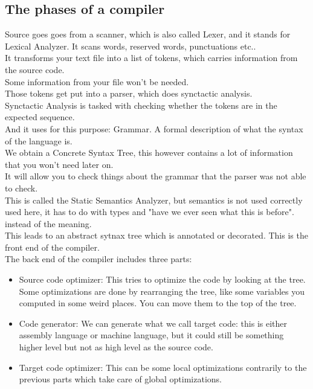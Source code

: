     \subsection{The phases of a compiler}
    Source goes goes from a scanner, which is also called Lexer, and it stands for Lexical Analyzer. It scans words, reserved words, punctuations etc.. \\
    It transforms your text file into a list of tokens, which carries information from the source code. \\
    Some information from your file won't be needed.\\
    Those tokens get put into a parser, which does synctactic analysis. \\
    Synctactic Analysis is tasked with checking whether the tokens are in the expected sequence.
    \\
    And it uses for this purpose: Grammar. A formal description of what the syntax of the language is.
    \\
    We obtain a Concrete Syntax Tree, this however contains a lot of information that  you won't need later on.\\
    It will allow you to check things about the grammar that the parser was not able to check. \\
    This is called the Static Semantics Analyzer, but semantics is not used correctly used here, it has to do with types and "have we ever seen what this is before". instead of the meaning. \\
    This leads to an abstract sytnax tree which is annotated or decorated. This is the front end of the compiler. \\
    The back end of the compiler includes three parts:
    \begin{itemize}
        \item Source code optimizer: This tries to optimize the code by looking at the tree. Some optimizations are done by rearranging the tree, like some variables you computed in some weird places. You can move them to the top of the tree. \\
        \item Code generator: We can generate what we call target code: this is either assembly language or machine language, but it could still be something higher level but not as high level as the source code. \\
        \item Target code optimizer: This can be some local optimizations contrarily to the previous parts which take care of global optimizations.
    \end{itemize}

